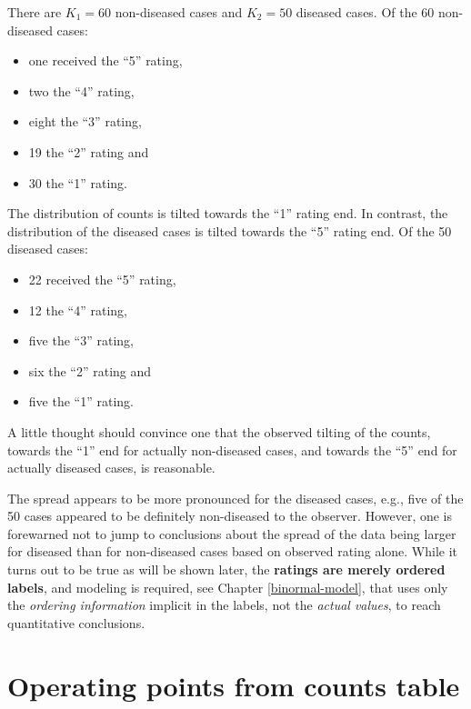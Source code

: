 \documentclass[
]{book}
\providecommand{\tightlist}{%
  \setlength{\itemsep}{0pt}\setlength{\parskip}{0pt}}
\begin{document}
There are \(K_1 = 60\) non-diseased cases and \(K_2 = 50\) diseased cases. Of the 60 non-diseased cases:

\begin{itemize}
\tightlist
\item
  one received the ``5'' rating,
\item
  two the ``4'' rating,
\item
  eight the ``3'' rating,
\item
  19 the ``2'' rating and
\item
  30 the ``1'' rating.
\end{itemize}

The distribution of counts is tilted towards the ``1'' rating end. In contrast, the distribution of the diseased cases is tilted towards the ``5'' rating end. Of the 50 diseased cases:

\begin{itemize}
\tightlist
\item
  22 received the ``5'' rating,
\item
  12 the ``4'' rating,
\item
  five the ``3'' rating,
\item
  six the ``2'' rating and
\item
  five the ``1'' rating.
\end{itemize}

A little thought should convince one that the observed tilting of the counts, towards the ``1'' end for actually non-diseased cases, and towards the ``5'' end for actually diseased cases, is reasonable.

The spread appears to be more pronounced for the diseased cases, e.g., five of the 50 cases appeared to be definitely non-diseased to the observer. However, one is forewarned not to jump to conclusions about the spread of the data being larger for diseased than for non-diseased cases based on observed rating alone. While it turns out to be true as will be shown later, the \textbf{ratings are merely ordered labels}, and modeling is required, see Chapter \ref{binormal-model}, that uses only the \emph{ordering information} implicit in the labels, not the \emph{actual values}, to reach quantitative conclusions.

\hypertarget{ratings-task-operating-points-from-counts-table}{%
\section{Operating points from counts table}\label{ratings-task-operating-points-from-counts-table}}
\end{document}
